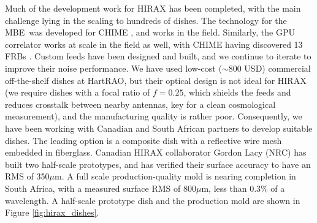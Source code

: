 \documentclass[letterpaper,11pt,preprint]{aastex}
\newcommand{\mbe}{{\rm MBE}}
\begin{document}

Much of the development work for HIRAX has been completed, with the
main challenge lying in the scaling to hundreds of dishes.  The technology for the
\mbe\ was developed for CHIME \citep{Bandura16}, and works in the
field.  Similarly, the GPU correlator \citep{Recnik15} 
works at scale in the field as well, with CHIME having discovered 13
FRBs \citep{chime_frbs}.  Custom feeds
have been designed and built, and we continue to iterate to improve
their noise performance.
We have used low-cost ($\sim$800 USD) commercial off-the-shelf dishes at HartRAO, but
their optical design is not ideal for HIRAX (we require dishes with a
focal ratio of $f=0.25$, which shields the feeds and reduces crosstalk
between nearby antennas, key for a clean cosmological measurement),
and the manufacturing quality is rather poor.  Consequently, we have
been working with Canadian and South African partners to develop
suitable dishes.  The leading option is a composite dish with a reflective
wire mesh embedded in fiberglass.  Canadian HIRAX collaborator Gordon
Lacy (NRC) has built two half-scale prototypes, and has verified their
surface accuracy to have an RMS of 350$\mu$m.  A full scale
production-quality mold is nearing completion in South Africa, with a
measured surface RMS of 800$\mu$m, less than 0.3\% of a wavelength.
A half-scale prototype dish and the production mold are shown in Figure
\ref{fig:hirax_dishes}. 
\end{document}
